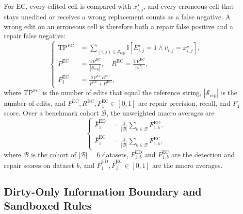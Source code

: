 \documentclass[conference]{IEEEtran}
\begin{document}
For EC, every edited cell is compared with $x_{i,j}^{\star}$, and every erroneous cell that stays unedited or receives a wrong replacement counts as a false negative. A wrong edit on an erroneous cell is therefore both a repair false positive and a repair false negative:
\begin{equation}
\label{eq:ec_metrics}
\left\{
\begin{aligned}
\mathrm{TP}^{\mathrm{EC}} &= \sum_{(i,j) \in \mathcal{S}_{\mathrm{rep}}} \mathbb{I}\!\left[E_{i,j}^{\star} = 1 \land \hat{v}_{i,j} = x_{i,j}^{\star}\right], \\
P^{\mathrm{EC}} &= \frac{\mathrm{TP}^{\mathrm{EC}}}{\left|\mathcal{S}_{\mathrm{rep}}\right|}, \quad
R^{\mathrm{EC}} = \frac{\mathrm{TP}^{\mathrm{EC}}}{\left|\mathcal{E}^{\star}\right|}, \\
F_1^{\mathrm{EC}} &= \frac{2 P^{\mathrm{EC}} R^{\mathrm{EC}}}{P^{\mathrm{EC}} + R^{\mathrm{EC}}},
\end{aligned}
\right.
\end{equation}
where $\mathrm{TP}^{\mathrm{EC}}$ is the number of edits that equal the reference string, $|\mathcal{S}_{\mathrm{rep}}|$ is the number of edits, and $P^{\mathrm{EC}}, R^{\mathrm{EC}}, F_1^{\mathrm{EC}} \in [0,1]$ are repair precision, recall, and $F_1$ score. Over a benchmark cohort $\mathcal{B}$, the unweighted macro averages are
\begin{equation}
\label{eq:macro_f1}
\left\{
\begin{aligned}
\bar{F}_1^{\mathrm{ED}} &= \frac{1}{\left|\mathcal{B}\right|} \sum_{b \in \mathcal{B}} F_{1,b}^{\mathrm{ED}}, \\
\bar{F}_1^{\mathrm{EC}} &= \frac{1}{\left|\mathcal{B}\right|} \sum_{b \in \mathcal{B}} F_{1,b}^{\mathrm{EC}},
\end{aligned}
\right.
\end{equation}
where $\mathcal{B}$ is the cohort of $|\mathcal{B}| = 6$ datasets, $F_{1,b}^{\mathrm{ED}}$ and $F_{1,b}^{\mathrm{EC}}$ are the detection and repair scores on dataset $b$, and $\bar{F}_1^{\mathrm{ED}}, \bar{F}_1^{\mathrm{EC}} \in [0,1]$ are the macro averages.

\subsection{Dirty-Only Information Boundary and Sandboxed Rules}
\label{subsec:prelim_boundary}
\end{document}

